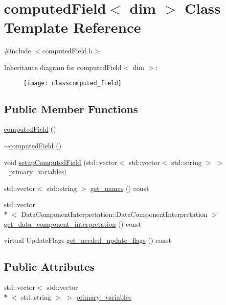 \section{computed\-Field$<$ dim $>$ Class Template Reference}
\label{classcomputed_field}


{\ttfamily \#include $<$computed\-Field.\-h$>$}

Inheritance diagram for computed\-Field$<$ dim $>$\-:\begin{figure}[H]
\begin{center}
\leavevmode
\texttt{[image: classcomputed\_field]}
\end{center}
\end{figure}
\subsection*{Public Member Functions}
\begin{DoxyCompactItemize}
\item 
\hyperlink{classcomputed_field_ab4f4245d1d8abf1daeedbf2784d6c42a}{computed\-Field} ()
\item 
\hyperlink{classcomputed_field_a23cfaecc3df333ef21739f65a72c81ff}{$\sim$computed\-Field} ()
\item 
void \hyperlink{classcomputed_field_ac6ff6cde468abcaa2ee7c9c4fd6b9047}{setup\-Computed\-Field} (std\-::vector$<$ std\-::vector$<$ std\-::string $>$ $>$ \-\_\-primary\-\_\-variables)
\item 
std\-::vector$<$ std\-::string $>$ \hyperlink{classcomputed_field_a72dd7a460e7aad3475596763311bfd81}{get\-\_\-names} () const 
\item 
std\-::vector\\*
$<$ Data\-Component\-Interpretation\-::\-Data\-Component\-Interpretation $>$ \hyperlink{classcomputed_field_abd61a7ab92eda357fabe2df46e86cf3f}{get\-\_\-data\-\_\-component\-\_\-interpretation} () const 
\item 
virtual Update\-Flags \hyperlink{classcomputed_field_a13b226a0ef121beb6ea2b7c3a4275218}{get\-\_\-needed\-\_\-update\-\_\-flags} () const 
\end{DoxyCompactItemize}
\subsection*{Public Attributes}
\begin{DoxyCompactItemize}
\item 
std\-::vector$<$ std\-::vector\\*
$<$ std\-::string $>$ $>$ \hyperlink{classcomputed_field_a4933860ad833b7b9bd2b8effee5c36d6}{primary\-\_\-variables}
\end{DoxyCompactItemize}


